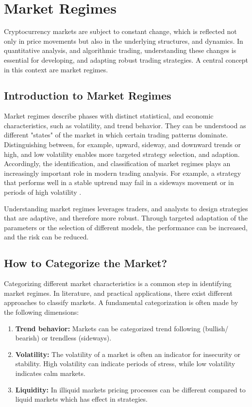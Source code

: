 \section{Market Regimes}

Cryptocurrency markets are subject to constant change, which is reflected not only in price movements but also in the underlying structures, and dynamics. In quantitative analysis, and algorithmic trading, understanding these changes is essential for developing, and adapting robust trading strategies. A central concept in this context are market regimes.

\subsection{Introduction to Market Regimes}

Market regimes describe phases with distinct statistical, and economic characteristics, such as volatility, and trend behavior. They can be understood as different "states" of the market in which certain trading patterns dominate. Distinguishing between, for example, upward, sideway, and downward trends or high, and low volatility enables more targeted strategy selection, and adaption. Accordingly, the identification, and classification of market regimes plays an increasingly important role in modern trading analysis. For example, a strategy that performs well in a stable uptrend may fail in a sideways movement or in periods of high volatility \cite{macrosynergy-market-regime-introduction}.

Understanding market regimes leverages traders, and analysts to design strategies that are adaptive, and therefore more robust. Through targeted adaptation of the parameters or the selection of different models, the performance can be increased, and the risk can be reduced.

\subsection{How to Categorize the Market?}
\label{chap:market-regime-categories}

Categorizing different market characteristics is a common step in identifying market regimes. In literature, and practical applications, there exist different approaches to classify markets. A fundamental categorization is often made by the following dimensions:

\begin{enumerate}
    \item \textbf{Trend behavior:} Markets can be categorized trend following (bullish/ bearish) or trendless (sideways).
    \item \textbf{Volatility:} The volatility of a market is often an indicator for insecurity or stability. High volatility can indicate periods of stress, while low volatility indicates calm markets.
    \item \textbf{Liquidity:} In illiquid markets pricing processes can be different compared to liquid markets which has effect in strategies.
\end{enumerate}

